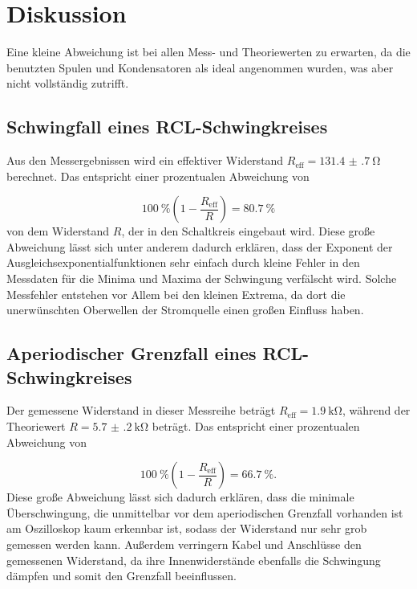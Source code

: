 \newpage

\section{Diskussion}
\label{sec:Diskussion}

Eine kleine Abweichung ist bei allen Mess- und Theoriewerten zu erwarten,
da die benutzten Spulen und Kondensatoren als ideal angenommen wurden, was
aber nicht vollständig zutrifft.


\subsection{Schwingfall eines RCL-Schwingkreises}

Aus den Messergebnissen wird ein effektiver Widerstand
$R_\text{eff} = \SI{131.4(7)}{\ohm}$ berechnet. Das entspricht einer
prozentualen Abweichung von

\begin{equation}
  \SI{100}{\percent} (1 - \frac{R_\text{eff}}{R}) = \SI{80.7}{\percent}
\end{equation}
von dem Widerstand $R$, der in den Schaltkreis eingebaut wird.
Diese große Abweichung lässt sich unter anderem dadurch erklären, dass
der Exponent der Ausgleichsexponentialfunktionen sehr einfach durch kleine
Fehler in den Messdaten für die Minima und Maxima der Schwingung verfälscht
wird. Solche Messfehler entstehen vor Allem bei den kleinen Extrema, da
dort die unerwünschten Oberwellen der Stromquelle einen großen Einfluss
haben.


\subsection{Aperiodischer Grenzfall eines RCL-Schwingkreises}

Der gemessene Widerstand in dieser Messreihe beträgt $R_\text{eff} =
\SI{1.9}{\kilo\ohm}$, während der Theoriewert
$R = \SI{5.7(2)}{\kilo\ohm}$ beträgt.
Das entspricht einer prozentualen Abweichung von

\begin{equation}
  \SI{100}{\percent} (1 - \frac{R_\text{eff}}{R}) = \SI{66.7}{\percent}.
\end{equation}
Diese große Abweichung lässt sich dadurch erklären, dass die minimale
Überschwingung, die unmittelbar vor dem aperiodischen Grenzfall vorhanden ist
am Oszilloskop kaum erkennbar ist, sodass der Widerstand nur sehr grob
gemessen werden kann.
Außerdem verringern Kabel und Anschlüsse den gemessenen Widerstand, da ihre
Innenwiderstände ebenfalls die Schwingung dämpfen und somit den Grenzfall
beeinflussen.


